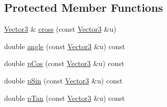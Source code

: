 \subsection*{Protected Member Functions}
\begin{DoxyCompactItemize}
\item 
\mbox{\hyperlink{class_vector3}{Vector3}} \& \mbox{\hyperlink{class_vector3_ab4221b101df67f562347dde6738c66fc}{cross}} (const \mbox{\hyperlink{class_vector3}{Vector3}} \&u)
\item 
double \mbox{\hyperlink{class_vector3_ab724696b92eb5f408a7d13de68ce6e8c}{angle}} (const \mbox{\hyperlink{class_vector3}{Vector3}} \&u) const
\item 
double \mbox{\hyperlink{class_vector3_aa49b3af23187b6a923870829a65d731c}{p\+Cos}} (const \mbox{\hyperlink{class_vector3}{Vector3}} \&u) const
\item 
double \mbox{\hyperlink{class_vector3_acadf5e36328563bc0cc11f1eb985d56a}{p\+Sin}} (const \mbox{\hyperlink{class_vector3}{Vector3}} \&u) const
\item 
double \mbox{\hyperlink{class_vector3_a1b31e026535ee175589d8f6a16c6ce15}{p\+Tan}} (const \mbox{\hyperlink{class_vector3}{Vector3}} \&u) const
\end{DoxyCompactItemize}
